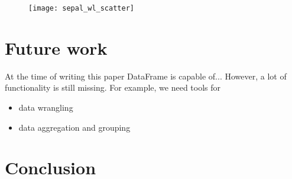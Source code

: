 \documentclass{article}
\begin{document}
\begin{multicols}{2}
\begin{figure}[H]
  \begin{center}
  \texttt{[image: sepal\_wl\_scatter]}
  \end{center}
\end{figure}

%
%


%

\section{Future work}
At the time of writing this paper DataFrame is capable of...
However, a lot of functionality is still missing. For example, we need tools for
\begin{itemize}
  \item data wrangling
  \item data aggregation and grouping
\end{itemize}

\section{Conclusion}
\label{sec:conclusion}



%


\end{multicols}
\end{document}
